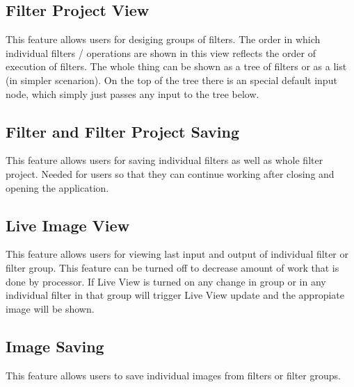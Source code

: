 \documentclass{article}
\begin{document}
\subsection{Filter Project View}
This feature allows users for desiging groups of filters. The order in which individual filters / operations are shown in this view reflects the order of execution of filters. The whole thing can be shown as a tree of filters or as a list (in simpler scenarion). On the top of the tree there is an special default input node, which simply just passes any input to the tree below.


\subsection{Filter and Filter Project Saving} 
This feature allows users for saving individual filters as well as whole filter project. Needed for users so that they can continue working after closing and opening the application.

\subsection{Live Image View}
This feature allows users for viewing last input and output of individual filter or filter group. This feature can be turned off to decrease amount of work that is done by processor. If Live View is turned on any change in group or in any individual filter in that group will trigger Live View update and the appropiate image will be shown.

\subsection{Image Saving}
This feature allows users to save individual images from filters or filter groups.
\end{document}
